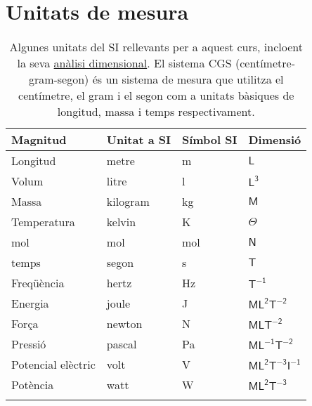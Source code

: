 \section{Unitats de mesura}

\begin{longtable}{llll}
    \caption{Algunes unitats del SI rellevants per a aquest curs, incloent la seva \href{https://en.wikipedia.org/wiki/Dimensional_analysis}{anàlisi dimensional}. El sistema CGS (centímetre-gram-segon) és un sistema de mesura que utilitza el centímetre, el gram i el segon com a unitats bàsiques de longitud, massa i temps respectivament.}\\
\toprule
\bfseries Magnitud & \bfseries Unitat a SI & \bfseries Símbol SI & \bfseries Dimensió\\\midrule
Longitud & metre & \si{\meter} & \(\mathsf{L}\) \\
Volum & litre & \si\litre & \(\mathsf{L^3}\) \\
Massa & kilogram & \si{\kilo\gram} & \(\mathsf{M}\) \\
Temperatura & kelvin & \si{\kelvin} & \(\mathsf{\Theta}\) \\
mol & mol & \si{\mole} & \(\mathsf{N}\) \\
temps & segon & \si\second & \(\mathsf{T}\) \\
Freqüència & hertz & \si{\hertz} & \(\mathsf{T^{-1}}\) \\
Energia & joule & \si\joule & \(\mathsf{ML^2T^{-2}}\) \\
Força & newton & \si\newton & \(\mathsf{MLT^{-2}}\) \\
Pressió & pascal & \si\pascal & \(\mathsf{ML^{-1}T^{-2}}\) \\
Potencial elèctric & volt & \si\volt & \(\mathsf{ML^2T^{-3}I^{-1}}\) \\
Potència & watt & \si\watt & \(\mathsf{ML^2T^{-3}}\) \\
\bottomrule
\label{tab:unitatsSI}
\end{longtable}

